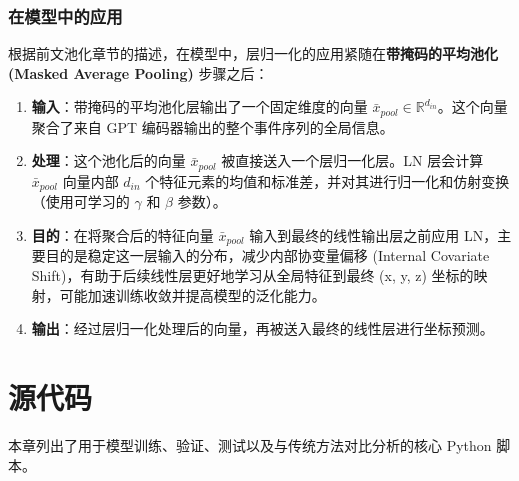 \subsection{在模型中的应用}

根据前文池化章节的描述，在模型中，层归一化的应用紧随在\textbf{带掩码的平均池化 (Masked Average Pooling)} 步骤之后：

\begin{enumerate}
    \item \textbf{输入}：带掩码的平均池化层输出了一个固定维度的向量 $\bar{x}_{pool} \in \mathbb{R}^{d_{in}}$。这个向量聚合了来自 GPT 编码器输出的整个事件序列的全局信息。
    \item \textbf{处理}：这个池化后的向量 $\bar{x}_{pool}$ 被直接送入一个层归一化层。LN 层会计算 $\bar{x}_{pool}$ 向量内部 $d_{in}$ 个特征元素的均值和标准差，并对其进行归一化和仿射变换（使用可学习的 $\gamma$ 和 $\beta$ 参数）。
    \item \textbf{目的}：在将聚合后的特征向量 $\bar{x}_{pool}$ 输入到最终的线性输出层之前应用 LN，主要目的是稳定这一层输入的分布，减少内部协变量偏移 (Internal Covariate Shift)，有助于后续线性层更好地学习从全局特征到最终 (x, y, z) 坐标的映射，可能加速训练收敛并提高模型的泛化能力。
    \item \textbf{输出}：经过层归一化处理后的向量，再被送入最终的线性层进行坐标预测。
\end{enumerate}

\chapter{源代码}

本章列出了用于模型训练、验证、测试以及与传统方法对比分析的核心 Python 脚本。

